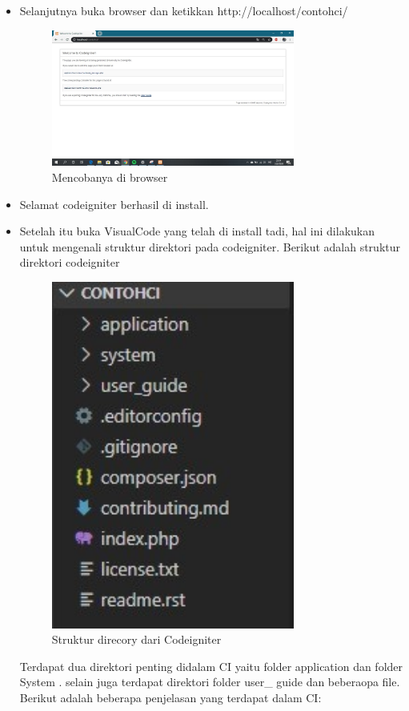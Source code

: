 \begin{itemize}
	\item Selanjutnya buka browser dan ketikkan  http://localhost/contohci/
	\begin{figure}[H]
		\includegraphics[width=8cm]{figures/instalasi/ci3.jpg}
		\centering
		\caption{Mencobanya di browser}
	\end{figure}	
	
	\item Selamat codeigniter berhasil di install.
	\item Setelah itu buka VisualCode yang telah di install tadi, hal ini dilakukan untuk mengenali struktur direktori pada codeigniter.
Berikut adalah struktur direktori codeigniter
	\begin{figure}[H]
		\includegraphics[width=8cm]{figures/instalasi/ci4.jpg}
		\centering
		\caption{Struktur direcory dari Codeigniter}
	\end{figure}
	Terdapat dua direktori penting didalam CI yaitu folder application dan folder System . selain juga terdapat direktori folder user\_ guide dan beberaopa file. Berikut adalah beberapa penjelasan yang terdapat dalam CI:	

\end{itemize}
